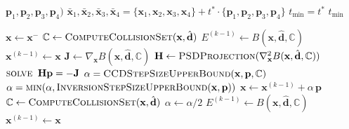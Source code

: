 \documentclass{article}
\begin{document}
\begin{algorithm}[H]
\begin{algorithmic}[1]
        \hspace{8em}$\mathbf{p}_1, \mathbf{p}_2, \mathbf{p}_3, \mathbf{p}_4)$
                \State \Continue
            \EndIf
            \State $
                \bar{\mathbf{x}}_1, \bar{\mathbf{x}}_2, \bar{\mathbf{x}}_3, \bar{\mathbf{x}}_4 = \{\mathbf{x}_1, \mathbf{x}_2, \mathbf{x}_3, \mathbf{x}_4\} + t^* \cdot \{\mathbf{p}_1, \mathbf{p}_2, \mathbf{p}_3, \mathbf{p}_4\}$
                \State $t_{\text{min}} = t^*$
            \EndIf
        \EndFor
    \EndFor
    \State \Return $t_{\text{min}}$
\EndFunction
\end{algorithmic}
\end{algorithm}

\begin{algorithm}[H]
\caption{.}
\label{alg:IPC_timestep}
\begin{algorithmic}[1]
\addtolength{\itemsep}{0.75ex}
    \State $\mathbf{x} \gets \mathbf{x}^-$
    \State $\mathbb{C} \gets \textsc{ComputeCollisionSet}(\mathbf{x}, \hat{\mathbf{d}})$
    \State $E^{(k-1)} \gets B(\mathbf{x}, \hat{\mathbf{d}}, \mathbb{C})$
    \State $\mathbf{x}^{(k-1)} \gets \mathbf{x}$
    \Do
        \State $\mathbf{J} \gets \nabla_\mathbf{x}B(\mathbf{x}, \hat{\mathbf{d}}, \mathbb{C})$
        \State $\mathbf{H} \gets \textsc{PSDProjection}(\nabla^2_\mathbf{x}B(\mathbf{x}, \hat{\mathbf{d}}, \mathbb{C}))$
        \State $\textsc{solve }\, \mathbf{H}\mathbf{p} = -\mathbf{J}$
        \State $\alpha = \textsc{CCDStepSizeUpperBound}(\mathbf{x}, \mathbf{p}, \mathbb{C})$
        \State $\alpha = \textsc{min}(\alpha, \textsc{InversionStepSizeUpperBound}(\mathbf{x}, \mathbf{p}))$
        \Do
            \State $\mathbf{x} \gets \mathbf{x}^{(k-1)} + \alpha\,\mathbf{p}$
            \State $\mathbb{C} \gets \textsc{ComputeCollisionSet}(\mathbf{x}, \hat{\mathbf{d}})$
            \State $\alpha \gets \alpha / 2$
        \State $E^{(k-1)} \gets B(\mathbf{x}, \hat{\mathbf{d}}, \mathbb{C})$
        \State $\mathbf{x}^{(k-1)} \gets \mathbf{x}$
    \State {}
\EndFunction
\end{algorithmic}
\end{algorithm}
\end{document}
